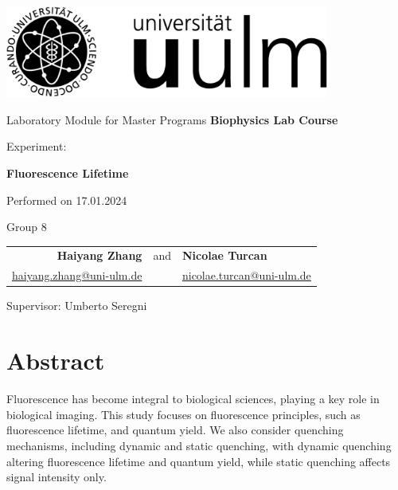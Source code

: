 \documentclass[a4paper,english,12pt,bibliography=totoc]{scrreprt}
\date{\today}
\begin{document}
\begin{titlepage}
	\centering
	\includegraphics[width=0.8\textwidth]{logo_uulm_sw}
	
	\vspace{1cm}
	\LARGE Laboratory Module for Master Programs
	\Huge \textbf{Biophysics Lab Course}
	
	\vspace{1cm}
	\Large Experiment:

	\Huge \textbf{Fluorescence Lifetime}
	
	\vspace{15mm}
	\Large Performed on 17.01.2024
	
	\vspace{5mm}
	\LARGE Group 8
	
	\vspace{1cm}
	\Large
	\begin{tabular}{rcl}
	\textbf{Haiyang Zhang} & and & \textbf{Nicolae Turcan}\\
	\href{mailto:student.1@uni-ulm.de}{haiyang.zhang@uni-ulm.de} & & \href{mailto:student.2@uni-ulm.de}{nicolae.turcan@uni-ulm.de}
	\end{tabular}
	
	\vspace{7mm}
	Supervisor: Umberto Seregni
	
	

\end{titlepage}



\tableofcontents

\chapter{Abstract}
\label{cha:abstract}

Fluorescence has become integral to biological sciences, playing a key role in biological imaging. This study focuses on fluorescence principles, such as fluorescence lifetime, and quantum yield. We also consider quenching mechanisms, including dynamic and static quenching, with dynamic quenching altering fluorescence lifetime and quantum yield, while static quenching affects signal intensity only.
\end{document}
